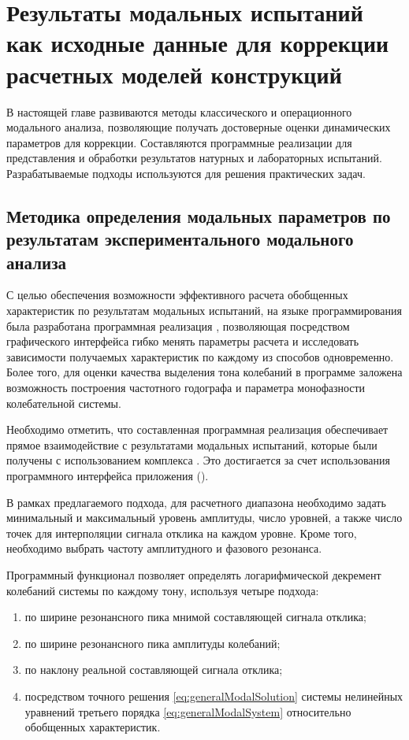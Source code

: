 \chapter{Результаты модальных испытаний как исходные данные для коррекции расчетных моделей конструкций}

В настоящей главе развиваются методы классического и операционного модального анализа, позволяющие получать достоверные оценки динамических параметров для коррекции. Составляются программные реализации для представления и обработки результатов натурных и лабораторных испытаний. Разрабатываемые подходы используются для решения практических задач. 

\section{Методика определения модальных параметров по результатам экспериментального модального анализа}

С целью обеспечения возможности эффективного расчета обобщенных характеристик по результатам модальных испытаний, на языке программирования  была разработана программная реализация , позволяющая посредством графического интерфейса  гибко менять параметры расчета и исследовать зависимости получаемых характеристик по каждому из способов одновременно. Более того, для оценки качества выделения тона колебаний в программе заложена возможность построения частотного годографа  и параметра монофазности  колебательной системы.

Необходимо отметить, что составленная программная реализация обеспечивает прямое взаимодействие с результатами модальных испытаний, которые были получены с использованием комплекса . Это достигается за счет использования программного интерфейса приложения  ().

В рамках предлагаемого подхода, для расчетного диапазона необходимо задать минимальный и максимальный уровень амплитуды, число уровней, а также число точек для интерполяции сигнала отклика на каждом уровне. Кроме того, необходимо выбрать частоту амплитудного и фазового резонанса.

Программный функционал позволяет определять логарифмической декремент колебаний системы по каждому тону, используя четыре подхода:
\begin{enumerate}
	\item по ширине резонансного пика мнимой составляющей сигнала отклика;
	\item по ширине резонансного пика амплитуды колебаний;
	\item по наклону реальной составляющей сигнала отклика;
	\item посредством точного решения \eqref{eq:generalModalSolution} системы нелинейных уравнений третьего порядка \eqref{eq:generalModalSystem} относительно обобщенных характеристик.
\end{enumerate}

